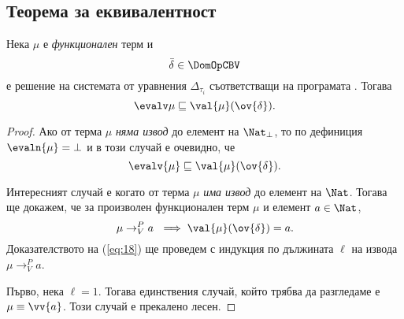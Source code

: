\subsection{Теорема за еквивалентност}

\begin{proposition}
  \label{pr:rec:op-value-inclusion1}
  Нека $\mu$ е {\em функционален} терм и
  \[\bar{\delta} \in \DomOpCBV\]
  е решение на системата от уравнения $\Delta_{\tau_i}$ съответстващи на програмата .
  Тогава 
  \[\evalv\mu \sqsubseteq \val{\mu}(\ov{\delta}).\]
\end{proposition}
\begin{proof}
  Ако от терма $\mu$ {\em няма извод} до елемент на $\Nat_\bot$, то
  по дефиниция $\evaln{\mu} = \bot$ и в този случай е очевидно, че
  \[\evalv{\mu} \sqsubseteq \val{\mu}(\ov{\delta}).\]

  Интересният случай е когато от терма $\mu$ {\em има извод} до елемент на $\Nat$.
  Тогава ще докажем, че за произволен функционален терм $\mu$ и елемент $a \in \Nat$, 
  \begin{equation}
    \label{eq:18}
    \mu\to^P_V a\ \implies \val{\mu}(\ov{\delta}) = a.
  \end{equation}
  Доказателството на (\ref{eq:18}) ще проведем с индукция по дължината $\ell$ на извода $\mu\to^P_V a$.

  Първо, нека $\ell = 1$. Тогава единствения случай, който трябва да разгледаме е $\mu \equiv \vv{a}$.
  Този случай е прекалено лесен.


\end{proof}
